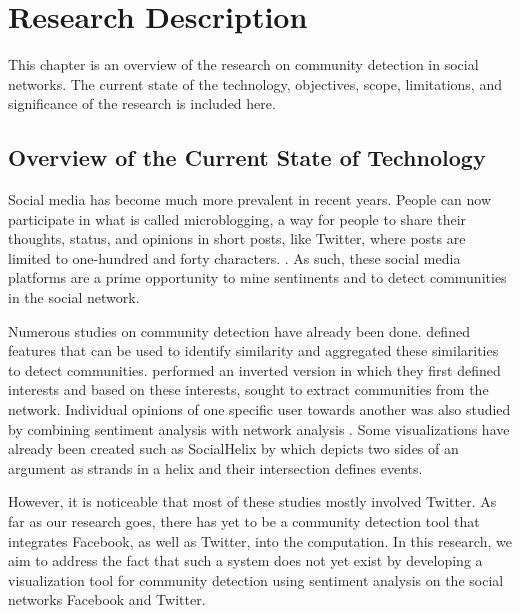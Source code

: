 %
%
%                 

\chapter{Research Description}
\label{sec:researchdesc}    %

This chapter is an overview of the research on community detection in social networks. 
The current state of the technology, objectives, scope, limitations, and significance of the research is 
included here.

\section{Overview of the Current State of Technology}
\label{sec:overview}

Social media has become much more prevalent in recent years. People can now participate in what is called microblogging, a way for people to share their thoughts, status, and opinions in short posts, like Twitter, where posts are limited to one-hundred and forty characters. \cite{Java:2007}. As such, these social media platforms are a prime opportunity to mine sentiments and to detect communities in the social network. 

Numerous studies on community detection have already been done.  defined features that can be used to identify similarity and aggregated these similarities to detect communities.  performed an inverted version in which they first defined interests and based on these interests, sought to extract communities from the network. Individual opinions of one specific user towards another was also studied by combining sentiment analysis with network analysis \cite{West:2014}. Some visualizations have already been created such as SocialHelix by  which depicts two sides of an argument as strands in a helix and their intersection defines events.

However, it is noticeable that most of these studies mostly involved Twitter. As far as our research goes, there has yet to be a community detection tool that integrates Facebook, as well as Twitter, into the computation. In this research, we aim to address the fact that such a system does not yet exist by developing a visualization tool for community detection using sentiment analysis on the social networks Facebook and Twitter.

